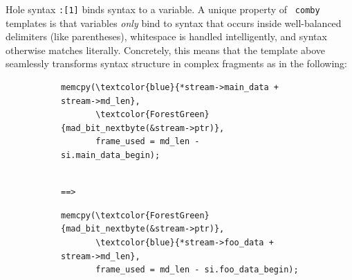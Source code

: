 Hole syntax \verb|:[1]| binds syntax to a variable. A unique property of {\tt
  comby} templates is that variables
\emph{only} bind to syntax that occurs
inside well-balanced delimiters (like parentheses), whitespace is handled intelligently, %
and syntax otherwise matches literally. %
Concretely, this means that the template above seamlessly transforms syntax structure in complex fragments as in the following:

\begin{figure}[!h]
\footnotesize
\begin{subfigure}[t]{.47\textwidth}
\centering
\begin{Verbatim}[commandchars=\\\{\}]
memcpy(\textcolor{blue}{*stream->main_data + stream->md_len},
       \textcolor{ForestGreen}{mad_bit_nextbyte(&stream->ptr)},
       frame_used = md_len - si.main_data_begin);
\end{Verbatim}
\end{subfigure}%
\begin{subfigure}[t]{.04\textwidth}
\begin{verbatim}

==>

\end{verbatim}
\end{subfigure}%
\begin{subfigure}[t]{.47\textwidth}
\begin{Verbatim}[commandchars=\\\{\}]
memcpy(\textcolor{ForestGreen}{mad_bit_nextbyte(&stream->ptr)},
       \textcolor{blue}{*stream->foo_data + stream->md_len},
       frame_used = md_len - si.foo_data_begin);
\end{Verbatim}
\end{subfigure}
\normalsize
\end{figure}

